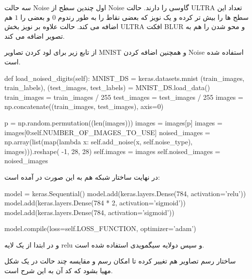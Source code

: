 \documentclass[12pt,titlepage,a4page , tikz , multi,table , svgnames,xcdraw]{article}
\begin{document}
سه حالت Noise اول چندین سطح از Noise گاوسی را دارند. حالت ULTRA تعداد این سطح ها را بیش تر کرده و یک نویز  که بعضی نقاط را به طور رندوم $0$ و بعضی را $1$ هم اضافه می کند. حالت  علاوه بر نویز بخش ULTRA افکت BLUR و محو شدن را هم به تصویر اضافه می کند.
 
 
 از تابع زیر برای لود کردن تصاویر MNIST و همچنین اضافه کردن Noise استفاده شده است.
 
 \begin{latin}
\begin{python}[language=Python]
  def load_noised_digits(self):
        MNIST_DS = keras.datasets.mnist
        (train_images, train_labels), (test_images, test_labels)
         = MNIST_DS.load_data()
        train_images = train_images / 255
        test_images = test_images / 255
        images = np.concatenate((train_images, test_images), axis=0)

        p = np.random.permutation((len(images)))
        images = images[p]
        images = images[0:self.NUMBER_OF_IMAGES_TO_USE]
        noised_images = np.array(list(map(lambda x:
         self.add_noise(x, self.noise_type), images))).reshape(
            -1, 28, 28)
        self.images = images
        self.noised_images = noised_images
\end{python}

\end{latin}
 
 در نهایت ساختار شبکه هم به این صورت در آمده است:
 
 
  \begin{latin}
\begin{python}[language=Python]
  model = keras.Sequential()
            model.add(keras.layers.Dense(784, activation='relu'))
            model.add(keras.layers.Dense(784 * 2,
             activation='sigmoid'))
            model.add(keras.layers.Dense(784, activation='sigmoid'))

            model.compile(loss=self.LOSS_FUNCTION, optimizer='adam')
\end{python}

\end{latin}

و در ابتدا از یک لایه relu و سپس دولایه سیگمویدی استفاده شده است.


ساختار رسم تصاویر هم تغییر کرده تا امکان رسم و مقایسه چند حالت در یک شکل مهیا بشود که کد آن به این شرح است.
\end{document}
